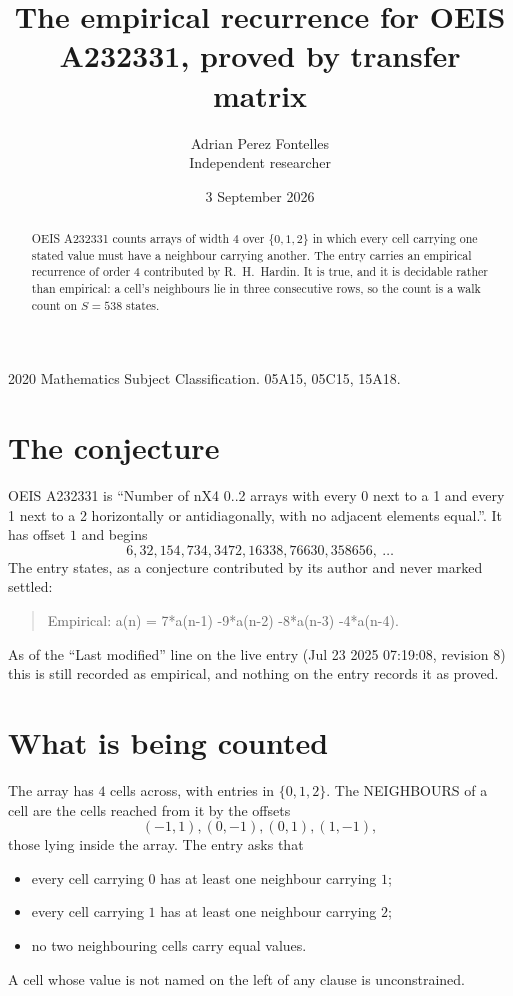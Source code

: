 \documentclass[11pt,a4paper]{article}
\title{The empirical recurrence for OEIS A232331, proved by transfer matrix}
\author{Adrian Perez Fontelles\\ \small Independent researcher}
\date{3 September 2026}
\theoremstyle{plain}
\theoremstyle{definition}
\begin{document}
\maketitle

\begin{abstract}
OEIS A232331 counts arrays of width $4$ over $\{0,1,2\}$ in which every cell carrying one stated
value must have a neighbour carrying another. The entry carries an empirical recurrence of
order $4$ contributed by R.~H.~Hardin. It is true, and it is decidable rather than
empirical: a cell's neighbours lie in three consecutive rows, so the count is a walk count on
$S=538$ states.
\end{abstract}

\noindent\small 2020 Mathematics Subject Classification. 05A15, 05C15, 15A18.\normalsize

\section{The conjecture}

OEIS A232331 is ``Number of nX4 0..2 arrays with every 0 next to a 1 and every 1 next to a 2 horizontally or antidiagonally, with no adjacent elements equal.''. It has offset $1$ and begins
\[
6, 32, 154, 734, 3472, 16338, 76630, 358656,\ \dots
\]
The entry states, as a conjecture contributed by its author and never marked settled:
\begin{quote}
Empirical: a(n) = 7*a(n-1) -9*a(n-2) -8*a(n-3) -4*a(n-4).
\end{quote}
As of the ``Last modified'' line on the live entry (Jul 23 2025 07:19:08, revision 8) this is still
recorded as empirical, and nothing on the entry records it as proved.

\section{What is being counted}

The array has $4$ cells across, with entries in $\{0,1,2\}$. The NEIGHBOURS of a cell are the
cells reached from it by the offsets
\[
(-1,1), (0,-1), (0,1), (1,-1),
\]
those lying inside the array. The entry asks that
\begin{itemize}
\item every cell carrying $0$ has at least one neighbour carrying $1$;
\item every cell carrying $1$ has at least one neighbour carrying $2$;
\item no two neighbouring cells carry equal values.
\end{itemize}
A cell whose value is not named on the left of any clause is unconstrained.
\end{document}
